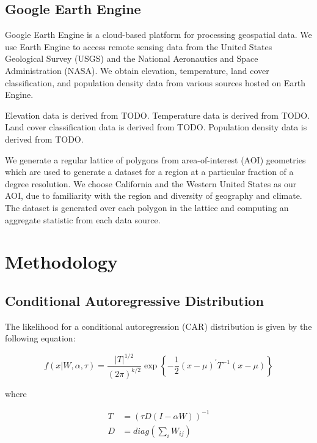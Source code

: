\documentclass[notitlepage]{article}
\begin{document}
\subsection{Google Earth Engine}

Google Earth Engine is a cloud-based platform for processing geospatial data.
We use Earth Engine to access remote sensing data from the United States Geological Survey (USGS) and the National Aeronautics and Space Administration (NASA).
We obtain elevation, temperature, land cover classification, and population density data from various sources hosted on Earth Engine.

Elevation data is derived from TODO.
Temperature data is derived from TODO.
Land cover classification data is derived from TODO.
Population density data is derived from TODO.

We generate a regular lattice of polygons from area-of-interest (AOI) geometries which are used to generate a dataset for a region at a particular fraction of a degree resolution.
We choose California and the Western United States as our AOI, due to familiarity with the region and diversity of geography and climate.
The dataset is generated over each polygon in the lattice and computing an aggregate statistic from each data source.

\section{Methodology}

\subsection{Conditional Autoregressive Distribution}

The likelihood for a conditional autoregression (CAR) distribution is given by the following equation:

\begin{equation}
f(x|W, \alpha, \tau) =
    \frac{|T|^{1/2}}{(2\pi)^{k/2}}
    \exp \left\{
        -\frac{1}{2} (x - \mu)^\prime T^{-1} (x - \mu)
    \right\}
\end{equation}

where

\begin{equation}
\begin{aligned}
    T &= (\tau D (I-\alpha W))^{-1} \\
    D &= diag(\sum_{i} W_{ij})
\end{aligned}
\end{equation}
\end{document}

